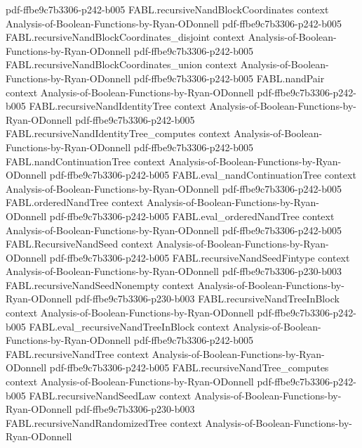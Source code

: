 \begin{theorem}
  {pdf-ffbe9c7b3306-p242-b005}
\proofstep
  {FABL.recursiveNandBlockCoordinates}
  {context}
  {Analysis-of-Boolean-Functions-by-Ryan-ODonnell}
  {pdf-ffbe9c7b3306-p242-b005}
\proofstep
  {FABL.recursiveNandBlockCoordinates_disjoint}
  {context}
  {Analysis-of-Boolean-Functions-by-Ryan-ODonnell}
  {pdf-ffbe9c7b3306-p242-b005}
\proofstep
  {FABL.recursiveNandBlockCoordinates_union}
  {context}
  {Analysis-of-Boolean-Functions-by-Ryan-ODonnell}
  {pdf-ffbe9c7b3306-p242-b005}
\proofstep
  {FABL.nandPair}
  {context}
  {Analysis-of-Boolean-Functions-by-Ryan-ODonnell}
  {pdf-ffbe9c7b3306-p242-b005}
\proofstep
  {FABL.recursiveNandIdentityTree}
  {context}
  {Analysis-of-Boolean-Functions-by-Ryan-ODonnell}
  {pdf-ffbe9c7b3306-p242-b005}
\proofstep
  {FABL.recursiveNandIdentityTree_computes}
  {context}
  {Analysis-of-Boolean-Functions-by-Ryan-ODonnell}
  {pdf-ffbe9c7b3306-p242-b005}
\proofstep
  {FABL.nandContinuationTree}
  {context}
  {Analysis-of-Boolean-Functions-by-Ryan-ODonnell}
  {pdf-ffbe9c7b3306-p242-b005}
\proofstep
  {FABL.eval_nandContinuationTree}
  {context}
  {Analysis-of-Boolean-Functions-by-Ryan-ODonnell}
  {pdf-ffbe9c7b3306-p242-b005}
\proofstep
  {FABL.orderedNandTree}
  {context}
  {Analysis-of-Boolean-Functions-by-Ryan-ODonnell}
  {pdf-ffbe9c7b3306-p242-b005}
\proofstep
  {FABL.eval_orderedNandTree}
  {context}
  {Analysis-of-Boolean-Functions-by-Ryan-ODonnell}
  {pdf-ffbe9c7b3306-p242-b005}
\proofstep
  {FABL.RecursiveNandSeed}
  {context}
  {Analysis-of-Boolean-Functions-by-Ryan-ODonnell}
  {pdf-ffbe9c7b3306-p242-b005}
\proofstep
  {FABL.recursiveNandSeedFintype}
  {context}
  {Analysis-of-Boolean-Functions-by-Ryan-ODonnell}
  {pdf-ffbe9c7b3306-p230-b003}
\proofstep
  {FABL.recursiveNandSeedNonempty}
  {context}
  {Analysis-of-Boolean-Functions-by-Ryan-ODonnell}
  {pdf-ffbe9c7b3306-p230-b003}
\proofstep
  {FABL.recursiveNandTreeInBlock}
  {context}
  {Analysis-of-Boolean-Functions-by-Ryan-ODonnell}
  {pdf-ffbe9c7b3306-p242-b005}
\proofstep
  {FABL.eval_recursiveNandTreeInBlock}
  {context}
  {Analysis-of-Boolean-Functions-by-Ryan-ODonnell}
  {pdf-ffbe9c7b3306-p242-b005}
\proofstep
  {FABL.recursiveNandTree}
  {context}
  {Analysis-of-Boolean-Functions-by-Ryan-ODonnell}
  {pdf-ffbe9c7b3306-p242-b005}
\proofstep
  {FABL.recursiveNandTree_computes}
  {context}
  {Analysis-of-Boolean-Functions-by-Ryan-ODonnell}
  {pdf-ffbe9c7b3306-p242-b005}
\proofstep
  {FABL.recursiveNandSeedLaw}
  {context}
  {Analysis-of-Boolean-Functions-by-Ryan-ODonnell}
  {pdf-ffbe9c7b3306-p230-b003}
\proofstep
  {FABL.recursiveNandRandomizedTree}
  {context}
  {Analysis-of-Boolean-Functions-by-Ryan-ODonnell}

\end{theorem}
